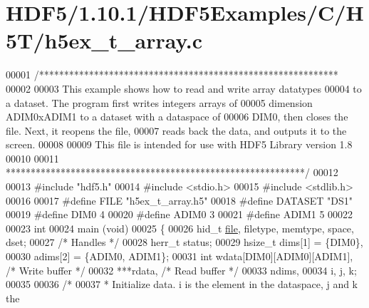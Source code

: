 \hypertarget{_h_d_f5_21_810_81_2_h_d_f5_examples_2_c_2_h5_t_2h5ex__t__array_8c_source}{}\section{H\+D\+F5/1.10.1/\+H\+D\+F5\+Examples/\+C/\+H5\+T/h5ex\+\_\+t\+\_\+array.c}
\label{_h_d_f5_21_810_81_2_h_d_f5_examples_2_c_2_h5_t_2h5ex__t__array_8c_source}

\begin{DoxyCode}
00001 \textcolor{comment}{/************************************************************}
00002 \textcolor{comment}{}
00003 \textcolor{comment}{  This example shows how to read and write array datatypes}
00004 \textcolor{comment}{  to a dataset.  The program first writes integers arrays of}
00005 \textcolor{comment}{  dimension ADIM0xADIM1 to a dataset with a dataspace of}
00006 \textcolor{comment}{  DIM0, then closes the  file.  Next, it reopens the file,}
00007 \textcolor{comment}{  reads back the data, and outputs it to the screen.}
00008 \textcolor{comment}{}
00009 \textcolor{comment}{  This file is intended for use with HDF5 Library version 1.8}
00010 \textcolor{comment}{}
00011 \textcolor{comment}{ ************************************************************/}
00012 
00013 \textcolor{preprocessor}{#include "hdf5.h"}
00014 \textcolor{preprocessor}{#include <stdio.h>}
00015 \textcolor{preprocessor}{#include <stdlib.h>}
00016 
00017 \textcolor{preprocessor}{#define FILE            "h5ex\_t\_array.h5"}
00018 \textcolor{preprocessor}{#define DATASET         "DS1"}
00019 \textcolor{preprocessor}{#define DIM0            4}
00020 \textcolor{preprocessor}{#define ADIM0           3}
00021 \textcolor{preprocessor}{#define ADIM1           5}
00022 
00023 \textcolor{keywordtype}{int}
00024 main (\textcolor{keywordtype}{void})
00025 \{
00026     hid\_t       \hyperlink{structfile}{file}, filetype, memtype, space, dset;
00027                                                 \textcolor{comment}{/* Handles */}
00028     herr\_t      status;
00029     hsize\_t     dims[1] = \{DIM0\},
00030                 adims[2] = \{ADIM0, ADIM1\};
00031     \textcolor{keywordtype}{int}         wdata[DIM0][ADIM0][ADIM1],      \textcolor{comment}{/* Write buffer */}
00032                 ***rdata,                       \textcolor{comment}{/* Read buffer */}
00033                 ndims,
00034                 i, j, k;
00035 
00036     \textcolor{comment}{/*}
00037 \textcolor{comment}{     * Initialize data.  i is the element in the dataspace, j and k the}

\end{DoxyCode}
